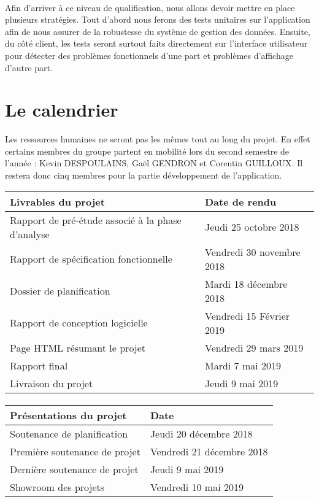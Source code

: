 \paragraph{}

Afin d’arriver à ce niveau de qualification, nous allons devoir mettre en place plusieurs  stratégies. Tout d’abord nous ferons des tests unitaires sur l’application afin de nous assurer de la robustesse du système de gestion des données. Ensuite, du côté client, les tests seront surtout faits directement sur l’interface utilisateur pour détecter des problèmes fonctionnels d’une part et problèmes d’affichage d’autre part.

\section{Le calendrier}

Les ressources humaines ne seront pas les mêmes tout au long du projet. En effet certains membres du groupe partent en mobilité lors du second semestre de l’année : Kevin DESPOULAINS, Gaël GENDRON et Corentin GUILLOUX. Il restera donc cinq membres pour la partie développement de l’application.

\begin{center}

\begin{tabular}{ | l | l | }
	\hline
	\textbf{Livrables du projet} & \textbf{Date de rendu} \\
	\hline
	Rapport de pré-étude associé à la phase d'analyse & Jeudi 25 octobre 2018 \\
	\hline
	Rapport de spécification fonctionnelle  & Vendredi 30 novembre 2018 \\
	\hline
	Dossier de planification & Mardi 18 décembre 2018 \\
	\hline
	Rapport de conception logicielle & Vendredi 15 Février 2019 \\
	\hline
	Page HTML résumant le projet & Vendredi 29 mars 2019 \\
	\hline
	Rapport final  & Mardi 7 mai 2019 \\
	\hline
	Livraison du projet & Jeudi 9 mai 2019 \\
	\hline
\end{tabular}

\paragraph{}

\begin{tabular}{ | l | l | }
	\hline
	\textbf{Présentations du projet} & \textbf{Date} \\
	\hline
	Soutenance de planification  & Jeudi 20 décembre 2018 \\
	\hline
	Première soutenance de projet  & Vendredi 21 décembre 2018 \\
	\hline
	Dernière soutenance de projet & Jeudi 9 mai 2019 \\
	\hline
	Showroom des projets & Vendredi 10 mai 2019 \\
	\hline
\end{tabular}

\end{center}

